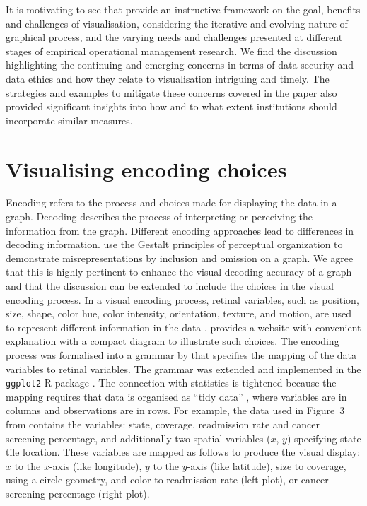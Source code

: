 \documentclass[ijds,nonblindrev]{informs-ijds}
\begin{document}
It is motivating to see that \citet{basole2021} provide an instructive framework on the goal, benefits and challenges of visualisation, considering the iterative and evolving nature of graphical process, and the varying needs and challenges presented at different stages of empirical operational management research. We find the discussion highlighting the continuing and emerging concerns in terms of data security and data ethics and how they relate to visualisation intriguing and timely. The strategies and examples to mitigate these concerns covered in the paper also provided significant insights into how and to what extent institutions should incorporate similar measures.

\section{Visualising encoding choices} \label{sec:plotdesign}

Encoding refers to the process and choices made for displaying the data in a graph. Decoding describes the process of interpreting or perceiving the information from the graph. Different encoding approaches lead to differences in decoding information. \citet{basole2021} use the Gestalt principles of perceptual organization to demonstrate misrepresentations by inclusion and omission on a graph. We agree that this is highly pertinent to enhance the visual decoding accuracy of a graph and that the discussion can be extended to include the choices in the visual encoding process. In a visual encoding process, retinal variables, such as position, size, shape, color hue, color intensity, orientation, texture, and motion, are used to represent different information in the data \citep{bertin1983semiology, munzner2014visualization}. \cite{graphworkflow} provides a website with convenient explanation with a compact diagram to illustrate such choices. The encoding process was formalised into a grammar by \citealp{Wilkinson2005-oz} that specifies the mapping of the data variables to retinal variables. The grammar was extended and implemented in the \texttt{ggplot2} R-package \citep{ggplot2}. The connection with statistics is tightened because the mapping requires that data is organised as ``tidy data'' \citep{tidyr}, where variables are in columns and observations are in rows. For example, the data used in Figure~3 from \citet{basole2021} contains the variables: state, coverage, readmission rate and cancer screening percentage, and additionally two spatial variables ($x$, $y$) specifying state tile location. These variables are mapped as follows to produce the visual display: $x$ to the $x$-axis (like longitude), $y$ to the $y$-axis (like latitude), size to coverage, using a circle geometry, and color to readmission rate (left plot), or cancer screening percentage (right plot).
\end{document}
